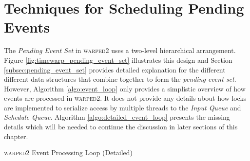 \documentclass[11pt]{book}
\begin{document}
\section[\textsc{Scheduling Techniques}]{Techniques for Scheduling Pending Events}\label{sec:scheduling_techniques}

The \emph{Pending Event Set} in \textsc{warped2} uses a two-level hierarchical arrangement.  Figure
\ref{fig:timewarp_pending_event_set} illustrates this design and Section \ref{subsec:pending_event_set}
provides detailed explanation for the different different data structures that combine together to form the
\emph{pending event set}.  However, Algorithm \ref{algo:event_loop} only provides a simplistic overview of how
events are processed in \textsc{warped2}.  It does not provide any details about how locks are implemented to
serialize access by multiple threads to the \emph{Input Queue} and \emph{Schedule Queue}.  Algorithm
\ref{algo:detailed_event_loop} presents the missing details which will be needed to continue the discussion in
later sections of this chapter.

\begin{algorithm}
\DontPrintSemicolon
{}


\caption{\textsc{warped2} Event Processing Loop (Detailed)}\label{algo:detailed_event_loop}
\end{algorithm}
\end{document}
